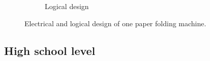 \documentclass{PDS}
\begin{document}
\begin{figure}[htbp]
\begin{subfigure}[b]{0.45\textwidth}
        \caption{Logical design}
        \label{fig:paper-sub-2}
    \end{subfigure}
    \caption{Electrical and logical design of one paper folding machine.}
    \label{fig:paper-sub}
\end{figure}








\subsection{High school level}
\label{sec:school}
\end{document}
